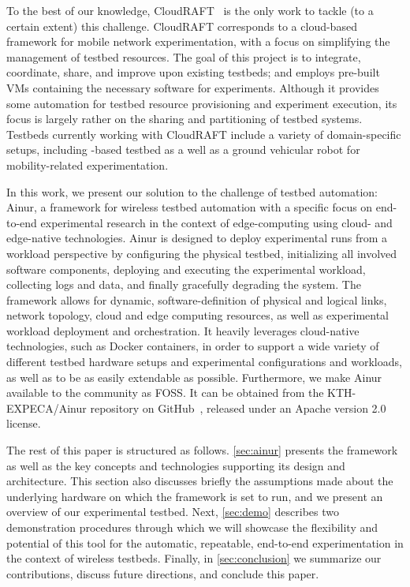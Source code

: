 To the best of our knowledge, CloudRAFT~\cite{cloudraft} is the only work to tackle (to a certain extent) this challenge.
CloudRAFT corresponds to a cloud-based framework for mobile network experimentation, with a focus on simplifying the management of testbed resources.
The goal of this project is to integrate, coordinate, share, and improve upon existing testbeds; and employs pre-built \acp{VM} containing the necessary software for experiments.
Although it provides some automation for testbed resource provisioning and experiment execution, its focus is largely rather on the sharing and partitioning of testbed systems.
Testbeds currently working with CloudRAFT include a variety of domain-specific setups, including -based testbed as a well as a ground vehicular robot for mobility-related experimentation.

In this work, we present our solution to the challenge of testbed automation: Ainur, a framework for wireless testbed automation with a specific focus on end-to-end experimental research in the context of edge-computing using cloud- and edge-native technologies.
Ainur is designed to deploy experimental runs from a workload perspective by configuring the physical testbed, initializing all involved software components, deploying and executing the experimental workload, collecting logs and data, and finally gracefully degrading the system.
The framework allows for dynamic, software-definition of physical and logical links, network topology, cloud and edge computing resources, as well as experimental workload deployment and orchestration.
It heavily leverages cloud-native technologies, such as Docker containers, in order to support a wide variety of different testbed hardware setups and experimental configurations and workloads, as well as to be as easily extendable as possible.
Furthermore, we make Ainur available to the community as \gls{FOSS}.
It can be obtained from the {KTH-EXPECA/Ainur} repository on GitHub~\cite{ainur:github}, released under an Apache version \num{2.0} license.

The rest of this paper is structured as follows.
\cref{sec:ainur} presents the framework as well as the key concepts and technologies supporting its design and architecture.
This section also discusses briefly the assumptions made about the underlying hardware on which the framework is set to run, and we present an overview of our experimental testbed.
Next, \cref{sec:demo} describes two demonstration procedures through which we will showcase the flexibility and potential of this tool for the automatic, repeatable, end-to-end experimentation in the context of wireless testbeds.
Finally, in \cref{sec:conclusion} we summarize our contributions, discuss future directions, and conclude this paper.


